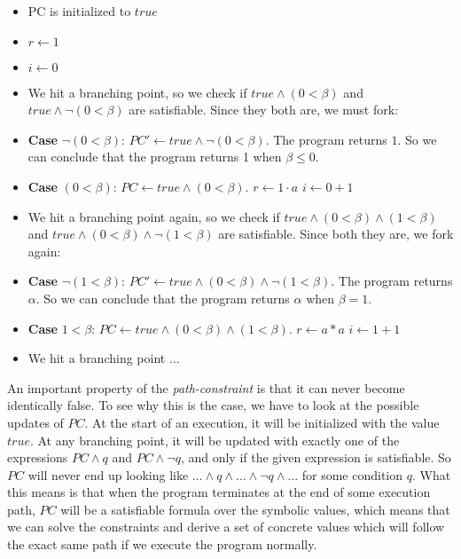		\begin{itemize}
			\item PC is initialized to $true$
			\item $r \gets 1$
			\item $i \gets 0$
			\item We hit a branching point, so we check if $true \land (0 < \beta)$ and $true \land \neg (0 < \beta)$ are satisfiable. Since they both are, we must fork:
			\item \textbf{Case} $ \neg (0 < \beta) $: $PC' \gets true \land \neg (0 < \beta) $.
				The program returns $1$. So we can conclude that the program returns 1 when $\beta \leq 0$.
			\item \textbf{Case} $ (0 < \beta)$: $PC \gets true \land (0 < \beta)$.
			\subitem  $ r \gets 1 \cdot a$
			\subitem  $ i \gets 0 + 1$
			\item We hit a branching point again, so we check if $true \land (0 < \beta) \land (1 < \beta)$ and $true \land (0 < \beta) \land \neg (1 < \beta)$ are satisfiable. Since both they are, we fork again:
			\item \textbf{Case} $ \neg(1 < \beta)$: $PC' \gets true \land (0 < \beta) \land \neg (1 < \beta)$. The program returns $\alpha$. So we can conclude that the program returns $\alpha$ when $ \beta = 1$.
			\item \textbf{Case} $ 1 < \beta$: $PC \gets true \land (0 < \beta) \land (1 < \beta)$.
			\subitem $r \gets a*a$
			\subitem $i \gets 1 + 1$
			\item We hit a branching point $\ldots$	
		\end{itemize}
		
		An important property of the \emph{path-constraint} is that it can never become identically false. To see why this is the case, we have to look at the possible updates of $PC$. At the start of an execution, it will be initialized with the value $true$. At any branching point, it will be updated with exactly one of the expressions $PC \land q$ and $PC \land \neg q$, and only if the given expression is satisfiable. So $PC$ will never end up looking like $\ldots \land q \land \ldots \land \neg q \land \ldots $ for some condition $q$. What this means is that when the program terminates at the end of some execution path, $PC$ will be a satisfiable formula over the symbolic values, which means that we can solve the constraints and derive a set of concrete values which will follow the exact same path if we execute the program normally.   
		
